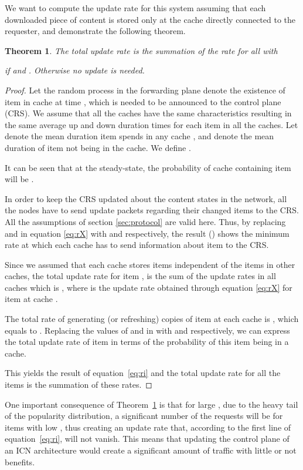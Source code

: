 \documentclass[conference]{IEEEtran}
\theoremstyle{plain}
\newtheorem{theorem}{Theorem}
\theoremstyle{remark}
\begin{document}
We want to compute the update rate for this system assuming that each downloaded piece of content is stored only at the cache directly connected to the requester, and demonstrate the following theorem.

\begin{theorem}\label{thm:1}
The total update rate is the summation of the rate  for all  with


if  and . Otherwise no update is needed.
\end{theorem}

\begin{proof}
Let the random process  in the forwarding plane denote the existence of item  in cache  at time , which is needed to be announced to the control plane (CRS). We assume that all the caches have the same characteristics resulting in the same average up and down duration times for each item in all the caches. Let  denote the mean duration item  spends in any cache , and  denote the mean duration of item  not being in the cache. We define .

It can be seen that at the steady-state, the probability of cache  containing item  will be .

In order to keep the CRS updated about the content states in the network, all the nodes have to send update packets regarding their changed items to the CRS. All the assumptions of section \ref{sec:protocol} are valid here. Thus, by replacing  and  in equation \ref{eq:rX} with  and  respectively, the result () shows the minimum rate at which each cache   has to send information about item  to the CRS.
	
Since we assumed that each cache stores items independent of the items in other caches, the total update rate for item , is the sum of the update rates in all caches which is , where  is the update rate obtained through equation \ref{eq:rX} for item  at cache .

The total rate of generating (or refreshing) copies of item  at each cache is , which equals to .
Replacing the values of  and  in  with  and  respectively, we can express the total update rate of item  in terms of the probability of this item being in a cache.

This yields the result of equation~\ref{eq:ri} and the total update rate for all the items is the summation of these rates.
\end{proof}

One important consequence of Theorem~\ref{thm:1} is that for large , due to the heavy tail of the popularity distribution, a significant number of the requests will be for items with low , thus creating an update rate that, according to the first line of equation~\ref{eq:ri}, will not vanish. This means that updating the control plane of an ICN architecture would create a significant amount of traffic with little or not benefits.
\end{document}
